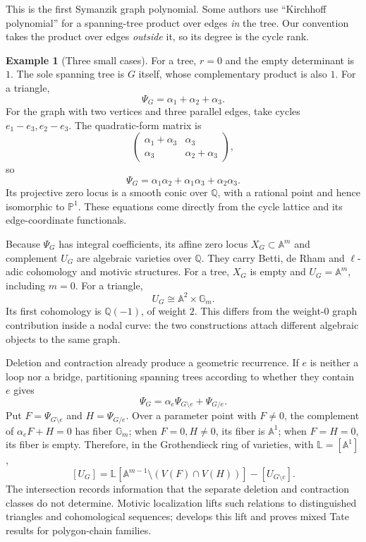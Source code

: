 \documentclass[11pt]{article}
\theoremstyle{definition}
\newtheorem{example}[theorem]{Example}
\theoremstyle{remark}
\newcommand{\Q}{\mathbb Q}
\begin{document}
This is the first Symanzik graph polynomial.  Some authors use
``Kirchhoff polynomial'' for a spanning-tree product over edges
\emph{in} the tree.  Our convention takes the product over edges
\emph{outside} it, so its degree is the cycle rank.

\begin{example}[Three small cases]
For a tree, $r=0$ and the empty determinant is $1$.  The sole spanning
tree is $G$ itself, whose complementary product is also $1$.
For a triangle,
\[
  \Psi_G=\alpha_1+\alpha_2+\alpha_3.
\]
For the graph with two vertices and three parallel edges, take cycles
$e_1-e_3,e_2-e_3$.  The quadratic-form matrix is
\[
  \begin{pmatrix}\alpha_1+\alpha_3&\alpha_3\\
                  \alpha_3&\alpha_2+\alpha_3\end{pmatrix},
\]
so
\[
  \Psi_G=\alpha_1\alpha_2+\alpha_1\alpha_3+\alpha_2\alpha_3.
\]
Its projective zero locus is a smooth conic over $\Q$, with a rational
point and hence isomorphic to $\mathbb P^1$.  These equations come
directly from the cycle lattice and its edge-coordinate functionals.
\end{example}

Because $\Psi_G$ has integral coefficients, its affine zero locus
$X_G\subset\mathbb A^m$ and complement $U_G$ are algebraic varieties
over $\Q$.  They carry Betti, de Rham and $\ell$-adic cohomology and
motivic structures.  For a tree, $X_G$ is empty and
$U_G=\mathbb A^m$, including $m=0$.  For a triangle,
\[
  U_G\cong\mathbb A^2\times\mathbb G_m.
\]
Its first cohomology is $\Q(-1)$, of weight $2$.  This differs from the
weight-$0$ graph contribution inside a nodal curve: the two constructions
attach different algebraic objects to the same graph.

Deletion and contraction already produce a geometric recurrence.  If
$e$ is neither a loop nor a bridge, partitioning spanning trees according
to whether they contain $e$ gives
\[
  \Psi_G=\alpha_e\Psi_{G\setminus e}+\Psi_{G/e}.
\]
Put $F=\Psi_{G\setminus e}$ and $H=\Psi_{G/e}$.  Over a parameter point
with $F\ne0$, the complement of $\alpha_eF+H=0$ has fiber
$\mathbb G_m$; when $F=0,H\ne0$, its fiber is $\mathbb A^1$; when
$F=H=0$, its fiber is empty.  Therefore, in the Grothendieck ring of
varieties, with $\mathbb L=[\mathbb A^1]$,
\[
  [U_G]=\mathbb L
   [\mathbb A^{m-1}\setminus(V(F)\cap V(H))]-[U_{G\setminus e}].
\]
The intersection records information that the separate deletion and
contraction classes do not determine.  Motivic localization lifts such
relations to distinguished triangles and cohomological sequences;
\cite[\S7]{AluffiMarcolliDeletionContraction} develops this lift and
proves mixed Tate results for polygon-chain families.
\end{document}
